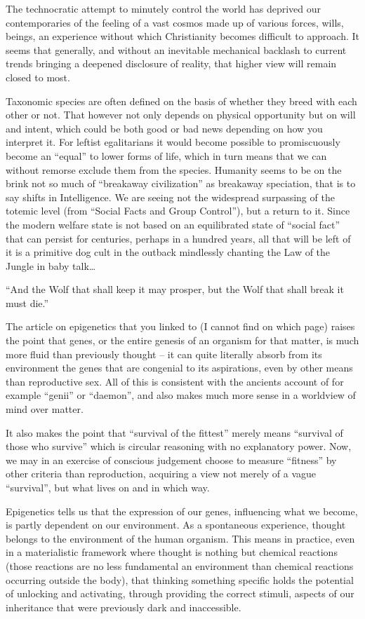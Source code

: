 \begin{footnotesize}
\begin{sffamily}
The technocratic attempt to minutely control the world has deprived our contemporaries of the feeling of a vast cosmos made up of various forces, wills, beings, an experience without which Christianity becomes difficult to approach. It seems that generally, and without an inevitable mechanical backlash to current trends bringing a deepened disclosure of reality, that higher view will remain closed to most.

Taxonomic species are often defined on the basis of whether they breed with each other or not. That however not only depends on physical opportunity but on will and intent, which could be both good or bad news depending on how you interpret it. For leftist egalitarians it would become possible to promiscuously become an “equal” to lower forms of life, which in turn means that we can without remorse exclude them from the species. Humanity seems to be on the brink not so much of “breakaway civilization” as breakaway speciation, that is to say shifts in Intelligence. We are seeing not the widespread surpassing of the totemic level (from “Social Facts and Group Control”), but a return to it. Since the modern welfare state is not based on an equilibrated state of “social fact” that can persist for centuries, perhaps in a hundred years, all that will be left of it is a primitive dog cult in the outback mindlessly chanting the Law of the Jungle in baby talk…

“And the Wolf that shall keep it may prosper, but the Wolf that shall break it must die.”

The article on epigenetics that you linked to (I cannot find on which page) raises the point that genes, or the entire genesis of an organism for that matter, is much more fluid than previously thought – it can quite literally absorb from its environment the genes that are congenial to its aspirations, even by other means than reproductive sex. All of this is consistent with the ancients account of for example “genii” or “daemon”, and also makes much more sense in a worldview of mind over matter.

It also makes the point that “survival of the fittest” merely means “survival of those who survive” which is circular reasoning with no explanatory power. Now, we may in an exercise of conscious judgement choose to measure “fitness” by other criteria than reproduction, acquiring a view not merely of a vague “survival”, but what lives on and in which way.

Epigenetics tells us that the expression of our genes, influencing what we become, is partly dependent on our environment. As a spontaneous experience, thought belongs to the environment of the human organism. This means in practice, even in a materialistic framework where thought is nothing but chemical reactions (those reactions are no less fundamental an environment than chemical reactions occurring outside the body), that thinking something specific holds the potential of unlocking and activating, through providing the correct stimuli, aspects of our inheritance that were previously dark and inaccessible.



\end{sffamily}
\end{footnotesize}
